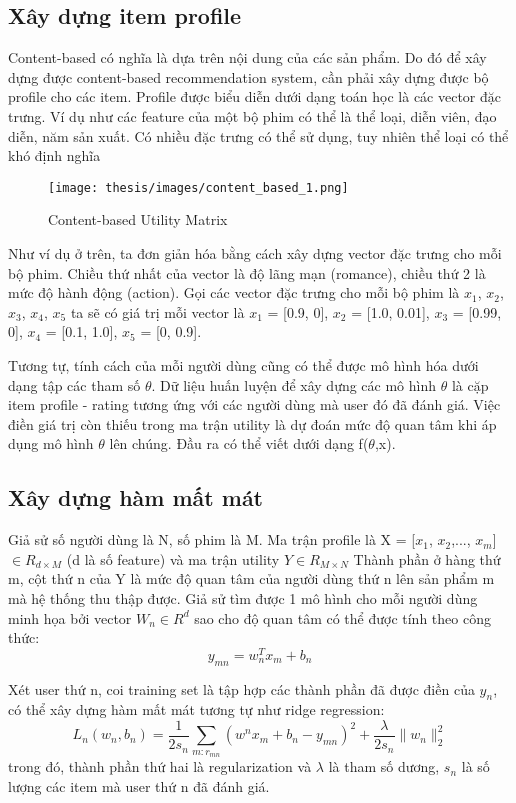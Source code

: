 \subsection{Xây dựng item profile}
Content-based có nghĩa là dựa trên nội dung của các sản phẩm. Do đó để xây dựng được content-based recommendation system, cần phải xây dựng được bộ profile cho các item. Profile được biểu diễn dưới dạng toán học là các vector đặc trưng. Ví dụ như các feature của một bộ phim có thể là thể loại, diễn viên, đạo diễn, năm sản xuất. Có nhiều đặc trưng có thể sử dụng, tuy nhiên thể loại có thể khó định nghĩa

\begin{figure}[ht]
\texttt{[image: thesis/images/content\_based\_1.png]}
\caption{Content-based Utility Matrix}
\end{figure}

Như ví dụ ở trên, ta đơn giản hóa bằng cách xây dựng vector đặc trưng cho mỗi bộ phim. Chiều thứ nhất của vector là độ lãng mạn (romance), chiều thứ 2 là mức độ hành động (action). Gọi các vector đặc trưng cho mỗi bộ phim là $x_1$, $x_2$, $x_3$, $x_4$, $x_5$ ta sẽ có giá trị mỗi vector là $x_1$ = [0.9, 0], $x_2$ = [1.0, 0.01], $x_3$ = [0.99, 0], $x_4$ = [0.1, 1.0], $x_5$ = [0, 0.9].

Tương tự, tính cách của mỗi người dùng cũng có thể được mô hình hóa dưới dạng tập các tham số $\theta$. Dữ liệu huấn luyện để xây dựng các mô hình $\theta$ là cặp item profile - rating tương ứng với các người dùng mà user đó đã đánh giá. Việc điền giá trị còn thiếu trong ma trận utility là dự đoán mức độ quan tâm khi áp dụng mô hình $\theta$ lên chúng. Đầu ra có thể viết dưới dạng f($\theta$,x). 

\subsection{Xây dựng hàm mất mát}
Giả sử số người dùng là N, số phim là M. Ma trận profile là X = [$x_1$, $x_2$,..., $x_m$] $ \in R_{d \times M}$ (d là số feature) và ma trận utility $Y \in R_{M \times N}$ Thành phần ở hàng thứ m, cột thứ n của Y là mức độ quan tâm của người dùng thứ n lên sản phẩm m mà hệ thống thu thập được. Giả sử tìm được 1 mô hình cho mỗi người dùng minh họa bởi vector $W_n \in R^d$ sao cho độ quan tâm có thể được tính theo công thức:
\begin{equation}
    y_{mn} = w^T_n x_m + b_n
\end{equation}

Xét user thứ n, coi training set là tập hợp các thành phần đã được điền của $y_n$, có thể xây dựng hàm mất mát tương tự như ridge regression:
\begin{equation}
    L_n(w_n,b_n)=\frac{1}{2s_n} \underset{m:r_{m n}}{\sum} (w^n x_m + b_n - y_{m n})^2 + 
    \frac{\lambda}{2s_n} \|w_n\|^2_2 
\end{equation}
trong đó, thành phần thứ hai là regularization và $\lambda$ là tham số dương, $s_n$ là số lượng các item mà user thứ n đã đánh giá.

